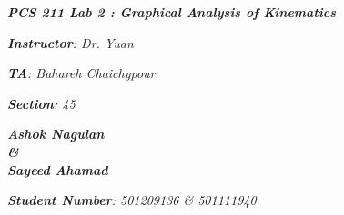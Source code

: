 

\begin{titlepage}
    \begin{center}
        \vspace*{1cm}
            
        \date{}
            
        \huge
            
        \textit{\textbf{PCS 211 Lab 2 : Graphical Analysis of Kinematics}}
            
        \vspace{0.25cm}
            
            
        \vspace{2.5cm}
            
		\vspace{0.25cm}
            
            
        \LARGE
            

		\textit{\textbf{Instructor}: Dr. Yuan}

		\textit{\textbf{TA}: Bahareh Chaichypour}

		\textit{\textbf{Section}: 45}

		\vspace{2.5cm}

		\textit{\textbf{Ashok Nagulan \\ \& \\ Sayeed Ahamad}}
            
            
        \Large         

		\vspace{5cm}

		\vspace{0cm}            
            
		\Large		
		        
		\vspace{0.25cm} 
		
		\textit{\textbf{Student Number}: 501209136 \& 501111940}
            
        \vspace{2cm}
            
        \Large
         
		\vspace{0.25cm}                  
            
        \vspace{0.25cm}
           
            
    \end{center}
\end{titlepage}



